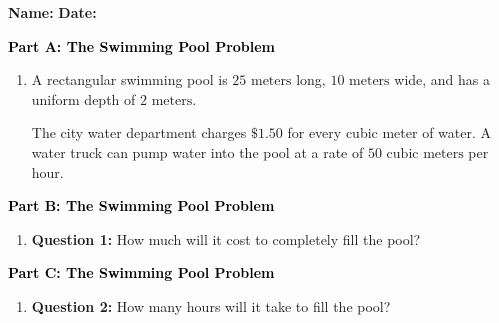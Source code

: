 \documentclass[12pt, letterpaper, fleqn]{article}
\begin{document}
\textbf{Name:} \underline{\hspace{5cm}}
\hfill
\textbf{Date:} \underline{\hspace{3cm}}\\

\begin{tcolorbox}[colback=customteal!20]
\large\textcolor{black}{\textbf{Part A: The Swimming Pool Problem}}
\end{tcolorbox}

\vspace{3mm}

\begin{enumerate}[itemsep=4.2cm, leftmargin=0.6cm]
\item A rectangular swimming pool is $25\text{ meters}$ long, $10\text{ meters}$ wide, and has a uniform depth of $2\text{ meters}$.

The city water department charges $\$1.50$ for every cubic meter of water. A water truck can pump water into the pool at a rate of $50\text{ cubic meters}$ per hour.

\end{enumerate}

\newpage

\begin{tcolorbox}[colback=customteal!20]
\large\textcolor{black}{\textbf{Part B: The Swimming Pool Problem}}
\end{tcolorbox}

\vspace{3mm}

\begin{enumerate}[itemsep=4.2cm, leftmargin=0.6cm, resume]
\item \textbf{Question 1:} How much will it cost to completely fill the pool?
\end{enumerate}

\newpage

\begin{tcolorbox}[colback=customteal!20]
\large\textcolor{black}{\textbf{Part C: The Swimming Pool Problem}}
\end{tcolorbox}

\vspace{3mm}

\begin{enumerate}[itemsep=4.2cm, leftmargin=0.6cm, resume]
\item \textbf{Question 2:} How many hours will it take to fill the pool?
\end{enumerate}
\end{document}
